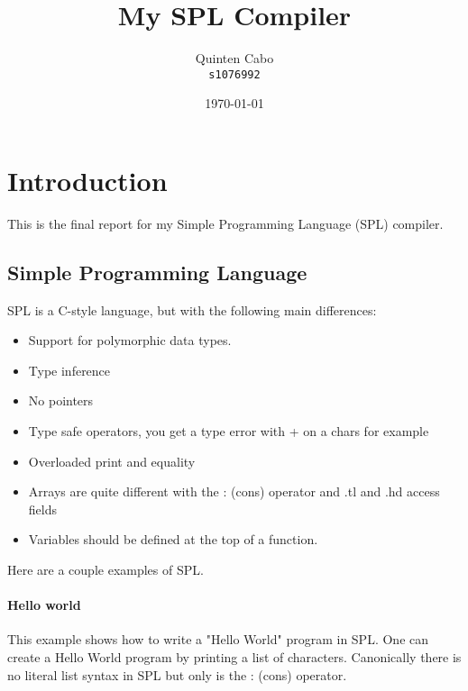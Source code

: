 \documentclass{report}
\author{%
	Quinten Cabo\\
	\small\texttt{s1076992}
}
\date{\today}
\title{My SPL Compiler}
\begin{document}
\maketitle%

\tableofcontents%

\vspace{1cm}


\pagebreak 

\chapter{Introduction} 

This is the final report for my Simple Programming Language (SPL) compiler. 

\section{Simple Programming Language}

SPL is a C-style language, but with the following main differences:

\begin{itemize}
    \item Support for polymorphic data types. 
    \item Type inference
    \item No pointers
    \item Type safe operators, you get a type error with + on a chars for example
    \item Overloaded print and equality
    \item Arrays are quite different with the : (cons) operator and .tl and .hd access fields
    \item Variables should be defined at the top of a function.
\end{itemize}

\noindent Here are a couple examples of SPL.

\subsubsection{Hello world} \label{sec:hello-world-example}
This example shows how to write a "Hello World" program in SPL. 
One can create a Hello World program by printing a list of characters.
Canonically there is no literal list syntax in SPL but only is the : (cons) operator. 
\end{document}
